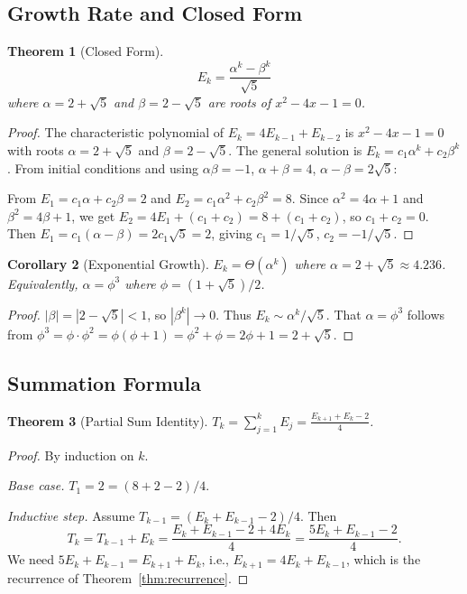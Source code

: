 \documentclass[11pt]{article}
\newtheorem{theorem}{Theorem}
\newtheorem{corollary}[theorem]{Corollary}
\begin{document}
\subsection{Growth Rate and Closed Form}

\begin{theorem}[Closed Form]
\label{thm:closed}
\[
E_k = \frac{\alpha^k - \beta^k}{\sqrt{5}}
\]
where $\alpha = 2 + \sqrt{5}$ and $\beta = 2 - \sqrt{5}$ are roots of $x^2 - 4x - 1 = 0$.
\end{theorem}

\begin{proof}
The characteristic polynomial of $E_k = 4E_{k-1} + E_{k-2}$ is $x^2 - 4x - 1 = 0$ with roots $\alpha = 2+\sqrt{5}$ and $\beta = 2 - \sqrt{5}$. The general solution is $E_k = c_1 \alpha^k + c_2 \beta^k$. From initial conditions and using $\alpha\beta = -1$, $\alpha + \beta = 4$, $\alpha - \beta = 2\sqrt{5}$:

From $E_1 = c_1\alpha + c_2\beta = 2$ and $E_2 = c_1\alpha^2 + c_2\beta^2 = 8$. Since $\alpha^2 = 4\alpha + 1$ and $\beta^2 = 4\beta + 1$, we get $E_2 = 4E_1 + (c_1 + c_2) = 8 + (c_1 + c_2)$, so $c_1 + c_2 = 0$. Then $E_1 = c_1(\alpha - \beta) = 2c_1\sqrt{5} = 2$, giving $c_1 = 1/\sqrt{5}$, $c_2 = -1/\sqrt{5}$.
\end{proof}

\begin{corollary}[Exponential Growth]
$E_k = \Theta(\alpha^k)$ where $\alpha = 2 + \sqrt{5} \approx 4.236$. Equivalently, $\alpha = \phi^3$ where $\phi = (1+\sqrt{5})/2$.
\end{corollary}

\begin{proof}
$|\beta| = |2-\sqrt{5}| < 1$, so $|\beta^k| \to 0$. Thus $E_k \sim \alpha^k/\sqrt{5}$. That $\alpha = \phi^3$ follows from $\phi^3 = \phi \cdot \phi^2 = \phi(\phi+1) = \phi^2 + \phi = 2\phi + 1 = 2 + \sqrt{5}$.
\end{proof}

\subsection{Summation Formula}

\begin{theorem}[Partial Sum Identity]
\label{thm:sum}
$\displaystyle T_k = \sum_{j=1}^{k} E_j = \frac{E_{k+1} + E_k - 2}{4}$.
\end{theorem}

\begin{proof}
By induction on $k$.

\emph{Base case.} $T_1 = 2 = (8+2-2)/4$. \checkmark

\emph{Inductive step.} Assume $T_{k-1} = (E_k + E_{k-1} - 2)/4$. Then
\[
T_k = T_{k-1} + E_k = \frac{E_k + E_{k-1} - 2 + 4E_k}{4} = \frac{5E_k + E_{k-1} - 2}{4}.
\]
We need $5E_k + E_{k-1} = E_{k+1} + E_k$, i.e., $E_{k+1} = 4E_k + E_{k-1}$, which is the recurrence of Theorem~\ref{thm:recurrence}.
\end{proof}
\end{document}
